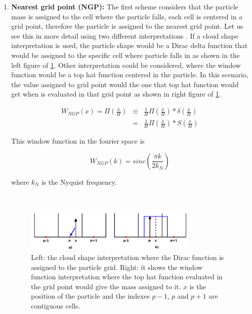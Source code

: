 \begin{enumerate}

\item \textbf{ Nearest grid point (NGP):} The first scheme considers that the particle mass is 
assigned to the cell where the particle falls, each cell is centered 
in a grid point, therefore the particle is assigned to the nearest grid point. 
Let us see this in more detail using two different interpretations \cite{hockney}. 
If a cloud shape interpretation is used, the particle 
shape would be a Dirac delta function that would be assigned to the specific cell 
where particle falls in as shown in the left figure of \ref{NGP}. Other interpretation 
could be considered, where the window function would be a top hat function centered in the particle. 
In this scenario, the value assigned to grid point would the one that top hat function 
would get when is evaluated in that grid point as shown in right figure of \ref{NGP}. 

\begin{eqnarray*}
 W_{NGP}(x)  =  \Pi \left( \frac{x}{H} \right) & \equiv & \frac{1}{H}\Pi\left(\frac{x}{H}\right) *\delta \left(\frac{x}{H}\right) \\ 
&  = &\frac{1}{H}\Pi\left(\frac{x}{H}\right)*S\left(\frac{x}{H}\right)
\end{eqnarray*}

This window function in the fourier space is

\[ W_{NGP}(k)= sinc\left(\frac{\pi k}{2k_N} \right)\]

where $k_N$ is the Nyquist frequency.

\

\begin{figure}[htbp]
       \centering
               \includegraphics[width=0.8\textwidth]{Images/chapter3/NGP.png}
       \caption{\small Left: the cloud shape interpretation where the Dirac function
       is assigned to the particle grid. Right: it shows the window function interpretation
       where the top hat function evaluated in the grid point would give the mass assigned to it. 
       $x$ is the position of the particle and the indexes $p-1$, $p$ and $p+1$ are contiguous cells. }
       \label{NGP}
 \end{figure}


\end{enumerate}
